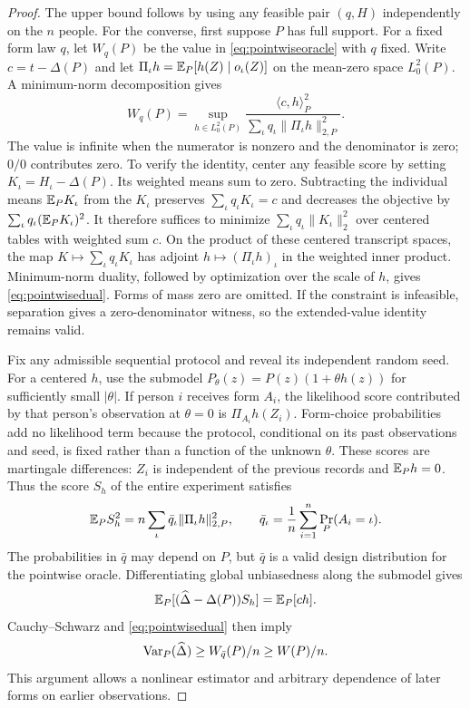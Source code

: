 \begin{proof}
The upper bound follows by using any feasible pair $(q,H)$ independently on the $n$ people. For the converse, first suppose $P$ has full support. For a fixed form law $q$, let $W_q(P)$ be the value in \eqref{eq:pointwiseoracle} with $q$ fixed. Write $c=t-\Delta(P)$ and let $\Pi_\iota h=\mathbb{E}_P[h(Z)\mid o_\iota(Z)]$ on the mean-zero space $L^2_0(P)$. A minimum-norm decomposition gives
\begin{equation}
 W_q(P)=\sup_{h\in L^2_0(P)}
   \frac{\langle c,h\rangle_P^2}{\sum_\iota q_\iota\|\Pi_\iota h\|_{2,P}^2}.
 \label{eq:pointwisedual}
\end{equation}
The value is infinite when the numerator is nonzero and the denominator is zero; $0/0$ contributes zero. To verify the identity, center any feasible score by setting $K_\iota=H_\iota-\Delta(P)$. Its weighted means sum to zero. Subtracting the individual means $\mathbb{E}_P K_\iota$ from the $K_\iota$ preserves $\sum_\iota q_\iota K_\iota=c$ and decreases the objective by $\sum_\iota q_\iota(\mathbb{E}_P K_\iota)^2$. It therefore suffices to minimize $\sum_\iota q_\iota\|K_\iota\|_2^2$ over centered tables with weighted sum $c$. On the product of these centered transcript spaces, the map $K\mapsto\sum_\iota q_\iota K_\iota$ has adjoint $h\mapsto(\Pi_\iota h)_\iota$ in the weighted inner product. Minimum-norm duality, followed by optimization over the scale of $h$, gives \eqref{eq:pointwisedual}. Forms of mass zero are omitted. If the constraint is infeasible, separation gives a zero-denominator witness, so the extended-value identity remains valid.

Fix any admissible sequential protocol and reveal its independent random seed. For a centered $h$, use the submodel $P_\theta(z)=P(z)(1+\theta h(z))$ for sufficiently small $|\theta|$. If person $i$ receives form $A_i$, the likelihood score contributed by that person's observation at $\theta=0$ is $\Pi_{A_i}h(Z_i)$. Form-choice probabilities add no likelihood term because the protocol, conditional on its past observations and seed, is fixed rather than a function of the unknown $\theta$. These scores are martingale differences: $Z_i$ is independent of the previous records and $\mathbb{E}_Ph=0$. Thus the score $S_h$ of the entire experiment satisfies
\begin{equation}
 \mathbb{E}_P S_h^2=n\sum_\iota\bar q_\iota\|\Pi_\iota h\|_{2,P}^2,
 \qquad
 \bar q_\iota=\frac1n\sum_{i=1}^n\Pr_P(A_i=\iota).
 \label{eq:sequentialinformation}
\end{equation}
The probabilities in $\bar q$ may depend on $P$, but $\bar q$ is a valid design distribution for the pointwise oracle. Differentiating global unbiasedness along the submodel gives
\[
 \mathbb{E}_P[(\widehat\Delta-\Delta(P))S_h]=\mathbb{E}_P[ch].
\]
Cauchy--Schwarz and \eqref{eq:pointwisedual} then imply
\[
 \operatorname{Var}_P(\widehat\Delta)\ge W_{\bar q}(P)/n\ge W(P)/n.
\]
This argument allows a nonlinear estimator and arbitrary dependence of later forms on earlier observations.


\end{proof}
